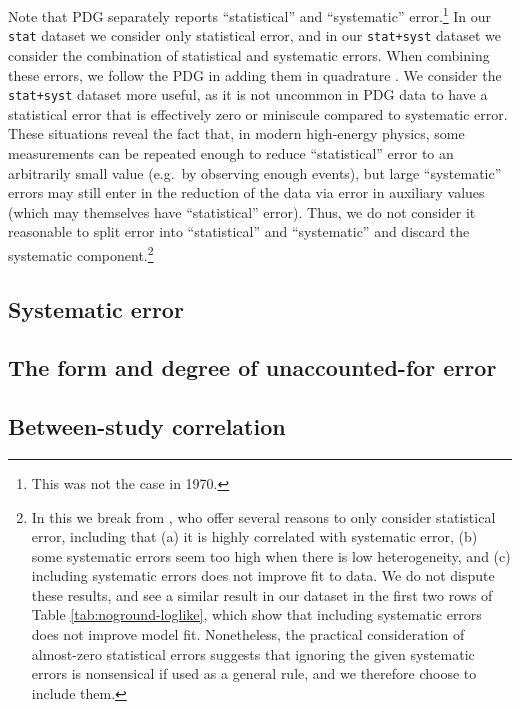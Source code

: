 \documentclass[12pt]{article}
\begin{document}
Note that PDG separately reports ``statistical'' and ``systematic'' error.\footnote{This was not the case in 1970.} In our \texttt{stat} dataset we consider only statistical error, and in our \texttt{stat+syst} dataset we consider the combination of statistical and systematic errors. When combining these errors, we follow the PDG in adding them in quadrature \citep[sec.~5.2.1]{navas2024review}. We consider the \texttt{stat+syst} dataset more useful, as it is not uncommon in PDG data to have a statistical error that is effectively zero or miniscule compared to systematic error. These situations reveal the fact that, in modern high-energy physics, some measurements can be repeated enough to reduce ``statistical'' error to an arbitrarily small value (e.g.~by observing enough events), but large ``systematic'' errors may still enter in the reduction of the data via error in auxiliary values (which may themselves have ``statistical'' error). Thus, we do not consider it reasonable to split error into ``statistical'' and ``systematic'' and discard the systematic component.\footnote{In this we break from \citet[sec.~3.3]{baker2013meta}, who offer several reasons to only consider statistical error, including that (a) it is highly correlated with systematic error, (b) some systematic errors seem too high when there is low heterogeneity, and (c) including systematic errors does not improve fit to data. We do not dispute these results, and see a similar result in our dataset in the first two rows of Table \ref{tab:noground-loglike}, which show that including systematic errors does not improve model fit. Nonetheless, the practical consideration of almost-zero statistical errors suggests that ignoring the given systematic errors is nonsensical if used as a general rule, and we therefore choose to include them.}

\subsection{Systematic error}

\subsection{The form and degree of unaccounted-for error}\label{sec:unaccounted}

\subsection{Between-study correlation}\label{sec:correlation}
\end{document}
